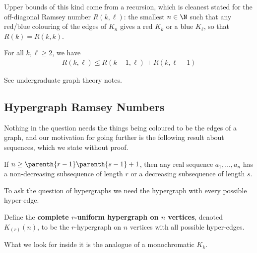 Upper bounds of this kind come from a recursion, which is cleanest stated for the off-diagonal Ramsey number $R(k, \ell)$: the smallest $n \in \N$ such that any red/blue colouring of the edges of $K_n$ gives a red $K_k$ or a blue $K_\ell$, so that $R(k) = R(k, k)$.

\begin{boxtheorem} \label{Ch2:Thm:Ramsey_Recursion}
    For all $k, \ell \geq 2$, we have
    \begin{align*}
        R(k, \ell) \leq R(k - 1, \ell) + R(k, \ell - 1)
    \end{align*}
\end{boxtheorem}

See undergraduate graph theory notes. 

\subsection{Hypergraph Ramsey Numbers}

Nothing in the question needs the things being coloured to be the edges of a graph, and our motivation for going further is the following result about sequences, which we state without proof.

\begin{boxtheorem}
    If $n \geq \parenth{r - 1}\parenth{s - 1} + 1$, then any real sequence $a_1, \ldots, a_n$ has a non-decreasing subsequence of length $r$ or a decreasing subsequence of length $s$.
\end{boxtheorem}

To ask the question of hypergraphs we need the hypergraph with every possible hyper-edge.

\begin{boxdefinition}
    Define the \textbf{complete $r$-uniform hypergraph on $n$ vertices}, denoted $K_{(r)}(n)$, to be the $r$-hypergraph on $n$ vertices with all possible hyper-edges.
\end{boxdefinition}

What we look for inside it is the analogue of a monochromatic $K_k$.


